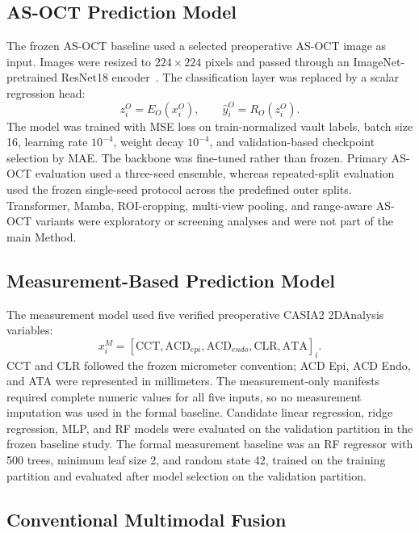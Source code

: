 \documentclass[10pt,twocolumn]{article}
\begin{document}
\subsection{AS-OCT Prediction Model}

The frozen AS-OCT baseline used a selected preoperative AS-OCT image as input. Images were resized to $224 \times 224$ pixels and passed through an ImageNet-pretrained ResNet18 encoder~\cite{resnet,imagenet}. The classification layer was replaced by a scalar regression head:
\begin{equation}
z_i^{O}=E_{O}(x_i^{O}), \qquad
\hat{y}_i^{O}=R_{O}(z_i^{O}).
\end{equation}
The model was trained with MSE loss on train-normalized vault labels, batch size 16, learning rate $10^{-4}$, weight decay $10^{-4}$, and validation-based checkpoint selection by MAE. The backbone was fine-tuned rather than frozen. Primary AS-OCT evaluation used a three-seed ensemble, whereas repeated-split evaluation used the frozen single-seed protocol across the predefined outer splits. Transformer, Mamba, ROI-cropping, multi-view pooling, and range-aware AS-OCT variants were exploratory or screening analyses and were not part of the main Method.

\subsection{Measurement-Based Prediction Model}

The measurement model used five verified preoperative CASIA2 2DAnalysis variables:
\begin{equation}
x_i^{M}=[\mathrm{CCT},\mathrm{ACD}_{epi},\mathrm{ACD}_{endo},
\mathrm{CLR},\mathrm{ATA}]_i .
\end{equation}
CCT and CLR followed the frozen micrometer convention; ACD Epi, ACD Endo, and ATA were represented in millimeters. The measurement-only manifests required complete numeric values for all five inputs, so no measurement imputation was used in the formal baseline. Candidate linear regression, ridge regression, MLP, and RF models were evaluated on the validation partition in the frozen baseline study. The formal measurement baseline was an RF regressor with 500 trees, minimum leaf size 2, and random state 42, trained on the training partition and evaluated after model selection on the validation partition.

\subsection{Conventional Multimodal Fusion}
\end{document}

